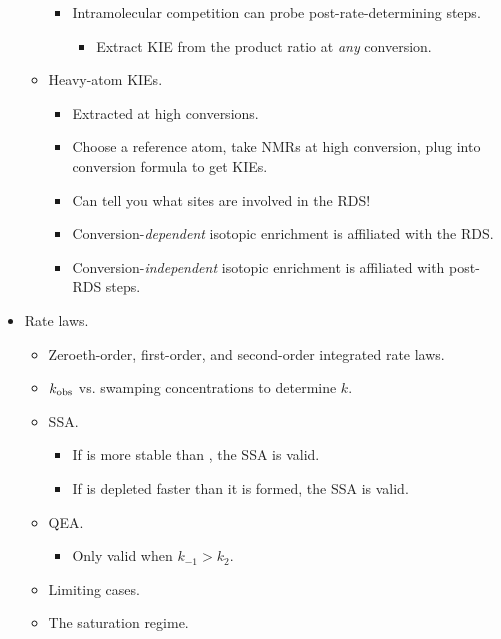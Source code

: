 \documentclass[../notes.tex]{subfiles}
\begin{document}
\begin{itemize}
\begin{itemize}
\begin{itemize}
\begin{itemize}
\begin{equation*}
                \end{equation*}
            \end{itemize}
            \item Intramolecular competition can probe post-rate-determining steps.
            \begin{itemize}
                \item Extract KIE from the product ratio at \emph{any} conversion.
            \end{itemize}
        \end{itemize}
        \item Heavy-atom KIEs.
        \begin{itemize}
            \item Extracted at high conversions.
            \item Choose a reference atom, take NMRs at high conversion, plug into conversion formula to get KIEs.
            \item Can tell you what sites are involved in the RDS!
            \item Conversion-\emph{dependent} isotopic enrichment is affiliated with the RDS.
            \item Conversion-\emph{independent} isotopic enrichment is affiliated with post-RDS steps.
        \end{itemize}
    \end{itemize}
    \item Rate laws.
    \begin{itemize}
        \item Zeroeth-order, first-order, and second-order integrated rate laws.
        \item $k_\textup{obs}$ vs. swamping concentrations to determine $k$.
        \item SSA.
        \begin{itemize}
            \item If  is more stable than , the SSA is valid.
            \item If  is depleted faster than it is formed, the SSA is valid.
        \end{itemize}
        \item QEA.
        \begin{itemize}
            \item Only valid when $k_{-1}>k_2$.
        \end{itemize}
        \item Limiting cases.
        \item The saturation regime.

\end{itemize}
\end{itemize}
\end{document}
